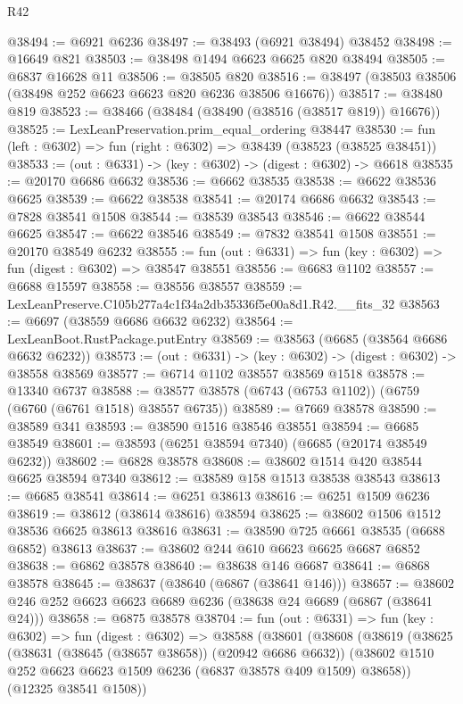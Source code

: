 \begin{lexlean}{R42}
\begin{coremodule}
{@38494 := @6921 @6236
@38497 := @38493 (@6921 @38494) @38452
@38498 := @16649 @821
@38503 := @38498 @1494 @6623 @6625 @820 @38494
@38505 := @6837 @16628 @11
@38506 := @38505 @820
@38516 := @38497 (@38503 @38506 (@38498 @252 @6623 @6623 @820 @6236 @38506 @16676))
@38517 := @38480 @819
@38523 := @38466 (@38484 (@38490 (@38516 (@38517 @819)) @16676))
@38525 := LexLeanPreservation.prim_equal_ordering @38447
@38530 := fun (left : @6302) => fun (right : @6302) => @38439 (@38523 (@38525 @38451))
@38533 := (out : @6331) -> (key : @6302) -> (digest : @6302) -> @6618
@38535 := @20170 @6686 @6632
@38536 := @6662 @38535
@38538 := @6622 @38536 @6625
@38539 := @6622 @38538
@38541 := @20174 @6686 @6632
@38543 := @7828 @38541 @1508
@38544 := @38539 @38543
@38546 := @6622 @38544 @6625
@38547 := @6622 @38546
@38549 := @7832 @38541 @1508
@38551 := @20170 @38549 @6232
@38555 := fun (out : @6331) => fun (key : @6302) => fun (digest : @6302) => @38547 @38551
@38556 := @6683 @1102
@38557 := @6688 @15597
@38558 := @38556 @38557
@38559 := LexLeanPreserve.C105b277a4c1f34a2db35336f5e00a8d1.R42.__fits_32
@38563 := @6697 (@38559 @6686 @6632 @6232)
@38564 := LexLeanBoot.RustPackage.putEntry
@38569 := @38563 (@6685 (@38564 @6686 @6632 @6232))
@38573 := (out : @6331) -> (key : @6302) -> (digest : @6302) -> @38558 @38569
@38577 := @6714 @1102 @38557 @38569 @1518
@38578 := @13340 @6737
@38588 := @38577 @38578 (@6743 (@6753 @1102)) (@6759 (@6760 (@6761 @1518) @38557 @6735))
@38589 := @7669 @38578
@38590 := @38589 @341
@38593 := @38590 @1516 @38546 @38551
@38594 := @6685 @38549
@38601 := @38593 (@6251 @38594 @7340) (@6685 (@20174 @38549 @6232))
@38602 := @6828 @38578
@38608 := @38602 @1514 @420 @38544 @6625 @38594 @7340
@38612 := @38589 @158 @1513 @38538 @38543
@38613 := @6685 @38541
@38614 := @6251 @38613
@38616 := @6251 @1509 @6236
@38619 := @38612 (@38614 @38616) @38594
@38625 := @38602 @1506 @1512 @38536 @6625 @38613 @38616
@38631 := @38590 @725 @6661 @38535 (@6688 @6852) @38613
@38637 := @38602 @244 @610 @6623 @6625 @6687 @6852
@38638 := @6862 @38578
@38640 := @38638 @146 @6687
@38641 := @6868 @38578
@38645 := @38637 (@38640 (@6867 (@38641 @146)))
@38657 := @38602 @246 @252 @6623 @6623 @6689 @6236 (@38638 @24 @6689 (@6867 (@38641 @24)))
@38658 := @6875 @38578
@38704 := fun (out : @6331) =>
  fun (key : @6302) =>
  fun (digest : @6302) =>
  @38588
    (@38601
      (@38608
        (@38619
          (@38625
            (@38631 (@38645 (@38657 @38658)) (@20942 @6686 @6632))
            (@38602 @1510 @252 @6623 @6623 @1509 @6236 (@6837 @38578 @409 @1509) @38658))
          (@12325 @38541 @1508))
}
\end{coremodule}
\end{lexlean}
